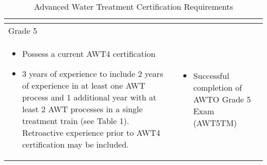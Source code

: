\begin{table}[H]
\begin{tabularx}{\textwidth}{| X | X |}
\begin{itemize}
\end{itemize}\\
\hline
\multicolumn{2}{|l|}{Grade 5}                                                                                                                                                                                                                                                                                                                                                                                                  \\
\hline
\begin{itemize} 
\item Possess a   current AWT4 certification 
\item 3 years of   experience to include 2 years of experience in at least one AWT process and 1   additional year with at least 2 AWT processes in a single treatment train   (see Table 1). Retroactive experience prior to AWT4 certification may be   included. 
\end{itemize}
&\begin{itemize}
\item Successful completion of AWTO Grade 5 Exam (AWT5TM)
\end{itemize}\\
\hline
\end{tabularx}

\caption{Advanced Water Treatment Certification Requirements}
\end{table}
